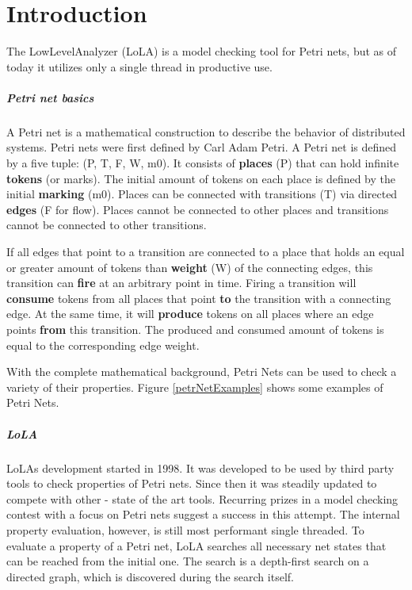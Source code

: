 \chapter{Introduction}
\label{introduction}

The LowLevelAnalyzer (LoLA) is a model checking tool for Petri nets, but as of today it utilizes only a single thread in productive use.

\paragraph*{Petri net basics}
A Petri net is a mathematical construction to describe the behavior of distributed systems. Petri nets were first defined by Carl Adam Petri\cite{Petri1962kommunikation}. A Petri net is defined by a five tuple: (P, T, F, W, m0). It consists of \textbf{places} (P) that can hold infinite \textbf{tokens} (or marks). The initial amount of tokens on each place is defined by the initial \textbf{marking} (m0). Places can be connected with transitions (T) via directed \textbf{edges} (F for flow). Places cannot be connected to other places and transitions cannot be connected to other transitions.

If all edges that point to a transition are connected to a place that holds an equal or greater amount of tokens than \textbf{weight} (W) of the connecting edges, this transition can \textbf{fire} at an arbitrary point in time. Firing a transition will \textbf{consume} tokens from all places that point \textbf{to} the transition with a connecting edge. At the same time, it will \textbf{produce} tokens on all places where an edge points \textbf{from} this transition. The produced and consumed amount of tokens is equal to the corresponding edge weight.

With the complete mathematical background, Petri Nets can be used to check a variety of their properties. Figure \ref{petrNetExamples} shows some examples of Petri Nets.



\paragraph*{LoLA}
LoLAs development started in 1998. It was developed to be used by third party tools to check properties of Petri nets\cite{schmidt2000lola}. Since then it was steadily updated to compete with other - state of the art tools. Recurring prizes in a model checking contest with a focus on Petri nets suggest a success in this attempt\cite{MCC2017}.
The internal property evaluation, however, is still most performant single threaded. To evaluate a property of a Petri net, LoLA searches all necessary net states that can be reached from the initial one. The search is a depth-first search on a directed graph, which is discovered during the search itself.

